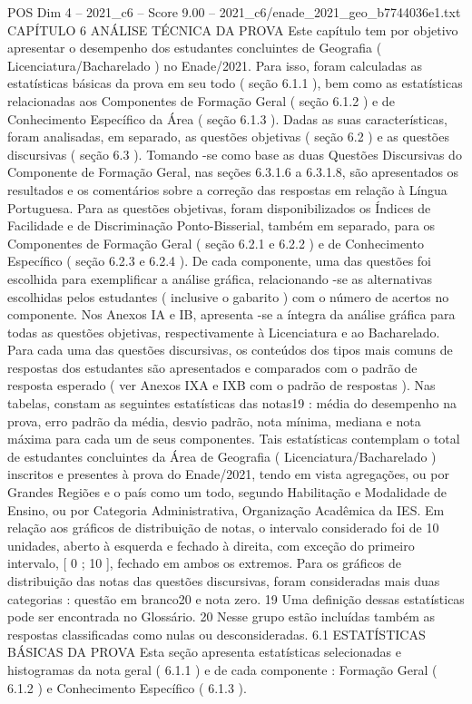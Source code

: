 \begin{textsample}{POS Dim 4 – 2021\_c6 – Score 9.00 – 2021\_c6/enade\_2021\_geo\_b7744036e1.txt}  \label{ex:f4_pos_061}
CAPÍTULO 6 ANÁLISE TÉCNICA DA PROVA Este capítulo tem por objetivo apresentar o desempenho dos estudantes concluintes de Geografia ( Licenciatura/Bacharelado ) no Enade/2021.
Para isso, foram calculadas as estatísticas básicas da prova em seu todo ( seção 6.1.1 ), bem como as estatísticas relacionadas aos Componentes de Formação Geral ( seção 6.1.2 ) e de Conhecimento Específico da Área ( seção 6.1.3 ).
Dadas as suas características, foram analisadas, em separado, as questões objetivas ( seção 6.2 ) e as questões discursivas ( seção 6.3 ).
Tomando -se como base as duas Questões Discursivas do Componente de Formação Geral, nas seções 6.3.1.6 a 6.3.1.8, são apresentados os resultados e os comentários sobre a correção das respostas em relação à Língua Portuguesa.
Para as questões objetivas, foram disponibilizados os Índices de Facilidade e de Discriminação Ponto-Bisserial, também em separado, para os Componentes de Formação Geral ( seção 6.2.1 e 6.2.2 ) e de Conhecimento Específico ( seção 6.2.3 e 6.2.4 ).
De cada componente, uma das questões foi escolhida para exemplificar a análise gráfica, relacionando -se as alternativas escolhidas pelos estudantes ( inclusive o gabarito ) com o número de acertos no componente.
Nos Anexos IA e IB, apresenta -se a íntegra da análise gráfica para todas as questões objetivas, respectivamente à Licenciatura e ao Bacharelado.
Para cada uma das questões discursivas, os conteúdos dos tipos mais comuns de respostas dos estudantes são apresentados e comparados com o padrão de resposta esperado ( ver Anexos IXA e IXB com o padrão de respostas ).
Nas tabelas, constam as seguintes estatísticas das notas19 : média do desempenho na prova, erro padrão da média, desvio padrão, nota mínima, mediana e nota máxima para cada um de seus componentes.
Tais estatísticas contemplam o total de estudantes concluintes da Área de Geografia ( Licenciatura/Bacharelado ) inscritos e presentes à prova do Enade/2021, tendo em vista agregações, ou por Grandes Regiões e o país como um todo, segundo Habilitação e Modalidade de Ensino, ou por Categoria Administrativa, Organização Acadêmica da IES.
Em relação aos gráficos de distribuição de notas, o intervalo considerado foi de 10 unidades, aberto à esquerda e fechado à direita, com exceção do primeiro intervalo, [ 0 ; 10 ], fechado em ambos os extremos.
Para os gráficos de distribuição das notas das questões discursivas, foram consideradas mais duas categorias : questão em branco20 e nota zero. 19 Uma definição dessas estatísticas pode ser encontrada no Glossário. 20 Nesse grupo estão incluídas também as respostas classificadas como nulas ou desconsideradas. 6.1 ESTATÍSTICAS BÁSICAS DA PROVA Esta seção apresenta estatísticas selecionadas e histogramas da nota geral ( 6.1.1 ) e de cada componente : Formação Geral ( 6.1.2 ) e Conhecimento Específico ( 6.1.3 ).

\end{textsample}
